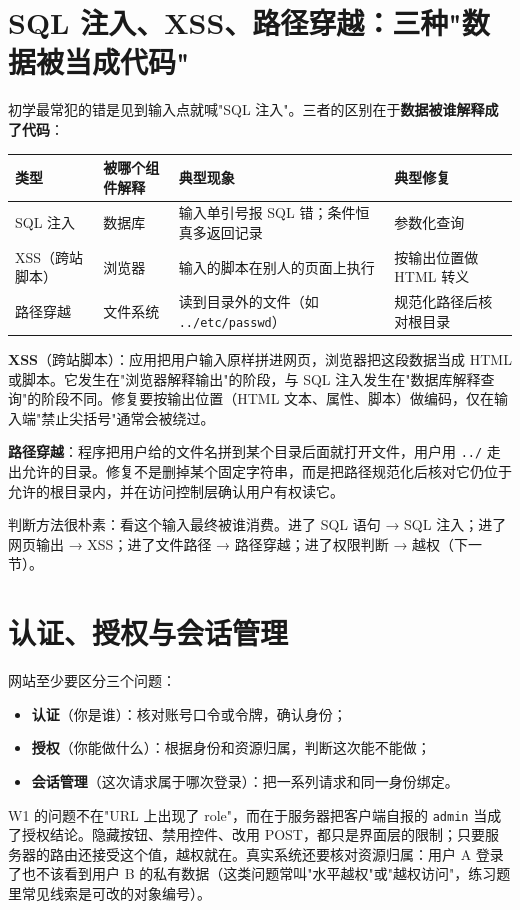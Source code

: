 \documentclass[UTF8,12pt,oneside]{ctexbook}
\begin{document}
\section{SQL 注入、XSS、路径穿越：三种"数据被当成代码"}
初学最常犯的错是见到输入点就喊"SQL 注入"。三者的区别在于\textbf{数据被谁解释成了代码}：
\begin{center}
\begin{tabular}{p{}p{}p{}p{}}
\toprule
类型 & 被哪个组件解释 & 典型现象 & 典型修复 \\
\midrule
SQL 注入 & 数据库 & 输入单引号报 SQL 错；条件恒真多返回记录 & 参数化查询 \\
XSS（跨站脚本）& 浏览器 & 输入的脚本在别人的页面上执行 & 按输出位置做 HTML 转义 \\
路径穿越 & 文件系统 & 读到目录外的文件（如 \verb|../etc/passwd|）& 规范化路径后核对根目录 \\
\bottomrule
\end{tabular}
\end{center}

\textbf{XSS}（跨站脚本）：应用把用户输入原样拼进网页，浏览器把这段数据当成 HTML 或脚本。它发生在"浏览器解释输出"的阶段，与 SQL 注入发生在"数据库解释查询"的阶段不同。修复要按输出位置（HTML 文本、属性、脚本）做编码，仅在输入端"禁止尖括号"通常会被绕过。

\textbf{路径穿越}：程序把用户给的文件名拼到某个目录后面就打开文件，用户用 \verb|../| 走出允许的目录。修复不是删掉某个固定字符串，而是把路径规范化后核对它仍位于允许的根目录内，并在访问控制层确认用户有权读它。

判断方法很朴素：看这个输入最终被谁消费。进了 SQL 语句 → SQL 注入；进了网页输出 → XSS；进了文件路径 → 路径穿越；进了权限判断 → 越权（下一节）。


\section{认证、授权与会话管理}
网站至少要区分三个问题：
\begin{itemize}
\item \textbf{认证}（你是谁）：核对账号口令或令牌，确认身份；
\item \textbf{授权}（你能做什么）：根据身份和资源归属，判断这次能不能做；
\item \textbf{会话管理}（这次请求属于哪次登录）：把一系列请求和同一身份绑定。
\end{itemize}
W1 的问题不在"URL 上出现了 role"，而在于服务器把客户端自报的 \verb|admin| 当成了授权结论。隐藏按钮、禁用控件、改用 POST，都只是界面层的限制；只要服务器的路由还接受这个值，越权就在。真实系统还要核对资源归属：用户 A 登录了也不该看到用户 B 的私有数据（这类问题常叫"水平越权"或"越权访问"，练习题里常见线索是可改的对象编号）。
\end{document}
